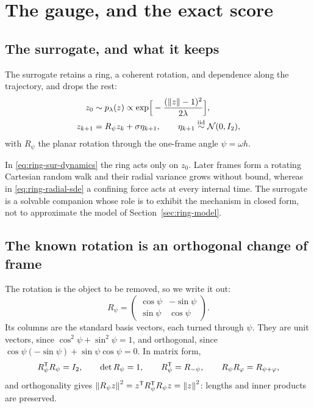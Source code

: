\section{The gauge, and the exact score}\label{sec:ring-surrogate}

\subsection{The surrogate, and what it keeps}

The surrogate retains a ring, a coherent rotation, and dependence along the
trajectory, and drops the rest:
\begin{align}
  z_0 &\sim p_\lambda(z) \propto
        \exp\!\Big[-\frac{(\left\lVert z \right\rVert-1)^2}{2\lambda}\Big] ,
  \label{eq:ring-sur-prior} \\
  z_{k+1} &= R_\psi z_k + \sigma \eta_{k+1} ,
        \qquad \eta_{k+1} \stackrel{\text{iid}}{\sim} \mathcal{N}(0, I_2) ,
  \label{eq:ring-sur-dynamics}
\end{align}
with $R_\psi$ the planar rotation through the one-frame angle
$\psi = \omega h$.

\begin{remark}
\label{rem:ring-surrogate-scope}
In \eqref{eq:ring-sur-dynamics} the ring acts only on $z_0$. Later frames form
a rotating Cartesian random walk and their radial variance grows without bound,
whereas in \eqref{eq:ring-radial-sde} a confining force acts at every internal
time. The surrogate is a solvable companion whose role is to exhibit the
mechanism in closed form, not to approximate the model of
Section~\ref{sec:ring-model}.
\end{remark}

\subsection{The known rotation is an orthogonal change of frame}

The rotation is the object to be removed, so we write it out:
\begin{equation}
  R_\psi =
  \begin{pmatrix} \cos\psi & -\sin\psi \\ \sin\psi & \cos\psi \end{pmatrix} .
  \label{eq:ring-rotation}
\end{equation}
Its columns are the standard basis vectors, each turned through $\psi$. They
are unit vectors, since $\cos^2\psi + \sin^2\psi = 1$, and orthogonal, since
$\cos\psi(-\sin\psi) + \sin\psi\cos\psi = 0$. In matrix form,
\begin{equation}
  R_\psi^{\mathsf{T}} R_\psi = I_2, \qquad \det R_\psi = 1, \qquad
  R_\psi^{\mathsf{T}} = R_{-\psi}, \qquad R_\psi R_\varphi = R_{\psi+\varphi} ,
  \label{eq:ring-rot-props}
\end{equation}
and orthogonality gives
$\left\lVert R_\psi z \right\rVert^2 = z^{\mathsf{T}} R_\psi^{\mathsf{T}} R_\psi z = \left\lVert z \right\rVert^2$: lengths and
inner products are preserved.


